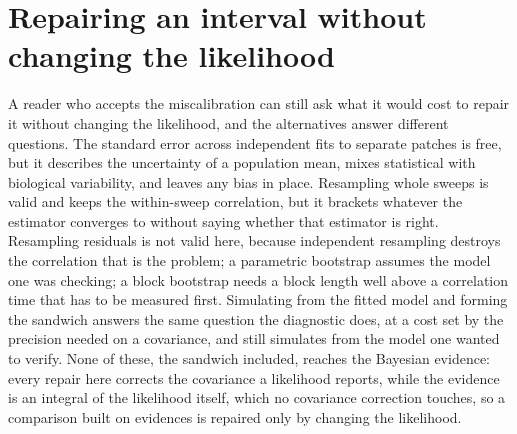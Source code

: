 \begin{appendixbox}
\label{app:repairs}
\section*{Repairing an interval without changing the likelihood}

A reader who accepts the miscalibration can still ask what it would cost to repair it without
changing the likelihood, and the alternatives answer different questions. The standard error across
independent fits to separate patches is free, but it describes the uncertainty of a population mean,
mixes statistical with biological variability, and leaves any bias in place. Resampling whole sweeps
is valid and keeps the within-sweep correlation, but it brackets whatever the estimator converges to
without saying whether that estimator is right. Resampling residuals is not valid here, because
independent resampling destroys the correlation that is the problem; a parametric bootstrap assumes
the model one was checking; a block bootstrap needs a block length well above a correlation time that
has to be measured first. Simulating from the fitted model and forming the sandwich answers the same
question the diagnostic does, at a cost set by the precision needed on a covariance, and still
simulates from the model one wanted to verify. None of these, the sandwich included, reaches the
Bayesian evidence: every repair here corrects the covariance a likelihood reports, while the
evidence is an integral of the likelihood itself, which no covariance correction touches, so a
comparison built on evidences is repaired only by changing the likelihood.

\end{appendixbox}
